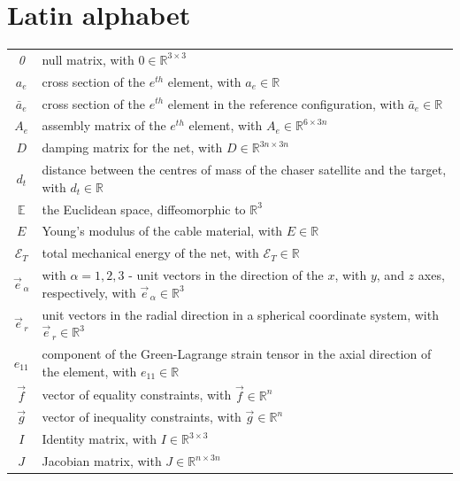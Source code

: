 \section*{Latin alphabet}
\begin{tabular}{cp{}}
  \textit{0} &  null matrix, with $ \textit{0} \in \mathbb{R}^{3 \times 3}$ \\
  $ a_e $ & cross section of the $e^{th}$ element, with $a_e \in \mathbb{R}$ \\
  $ \bar{a}_e $ & cross section of the $e^{th}$ element in the reference configuration, with $\bar{a}_e \in \mathbb{R}$ \\
  $ A_e $ & assembly matrix of the $e^{th}$ element, with  $ A_e \in \mathbb{R}^{6 \times 3n} $ \\
  $D$ & damping matrix for the net, with $ D \in \mathbb{R}^{3n \times 3n} $ \\
  $d_t$ & distance between the centres of mass of the chaser satellite and the target, with $d_t \in \mathbb{R} $\\
  $\mathbb{E}$ & the Euclidean space, diffeomorphic to $\mathbb{R}^3$ \\
  $E$ & Young's modulus of the cable material, with $E \in \mathbb{R} $ \\
  $\mathcal{E}_T$ & total mechanical energy of the net, with $\mathcal{E}_T \in \mathbb{R}$ \\
  $ \vec{e}_{\, \alpha} $ & with $\alpha = 1, 2, 3$ - unit vectors in the direction of the $x$, with $y$, and $z$ axes, respectively, with $\vec{e}_{\, \alpha} \in \mathbb{R}^{3} $ \\
  $ \vec{e}_{\, r} $ & unit vectors in the radial direction in a spherical coordinate system, with $\vec{e}_{\, r} \in \mathbb{R}^{3} $ \\
  $ e_{11} $ & component of the Green-Lagrange strain tensor in the axial direction of the element, with $e_{11} \in \mathbb{R}$\\
  $ \vec{f} $ & vector of equality constraints, with $\vec{f} \in \mathbb{R}^{n} $ \\
  $ \vec{g} $ & vector of inequality constraints, with $\vec{g} \in \mathbb{R}^{n} $ \\
  $ I $ &  Identity matrix, with $ I \in \mathbb{R}^{3 \times 3}$ \\
  $ J $ &  Jacobian matrix, with $ J \in \mathbb{R}^{n \times 3 n}$ \\

\end{tabular}
